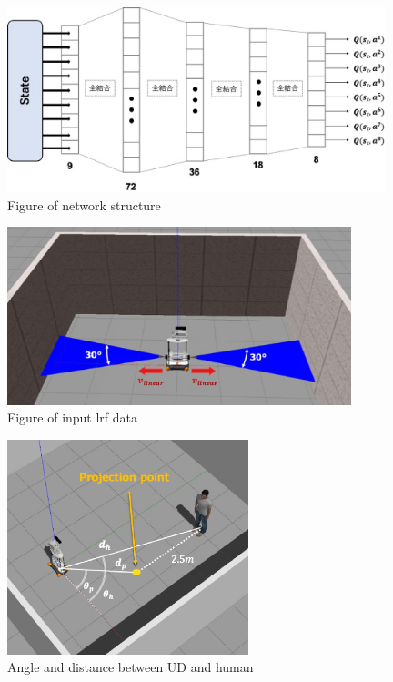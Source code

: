 \documentclass[12pt]{sonota/aislab}
\begin{document}
\begin{figure}[t]
\begin{center}
\includegraphics[clip, width=11cm]{figs/network_structure.eps}
\caption{Figure of network structure}
\label{structure}
\end{center}
\end{figure}

\begin{figure}[t]
\begin{center}
\includegraphics[clip, width=10cm]{figs/input_lrf_data.eps}
\caption{Figure of input lrf data}
\label{input_lrf}
\end{center}
\end{figure}

\begin{figure}[t]
\begin{center}
\includegraphics[clip, width=7cm]{figs/input_human_network.eps}
\caption{Angle and distance between UD and human}
\label{input_term}
\end{center}
\end{figure}
\end{document}
